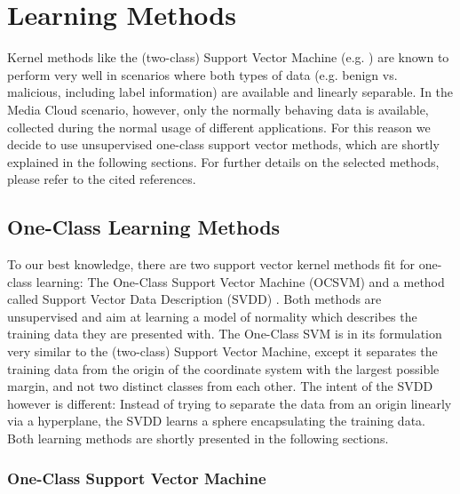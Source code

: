 \documentclass{llncs}
\begin{document}
\section{Learning Methods}
\label{sec:learningmethods}
Kernel methods like the (two-class) Support Vector Machine (e.g. \cite{cortes1995support,ShaChr04}) are known to perform very well in scenarios where both types of data (e.g. benign vs. malicious, including label information) are available and linearly separable. In the Media Cloud scenario, however, only the normally behaving data is available, collected during the normal usage of different applications. For this reason we decide to use unsupervised one-class support vector methods, which are shortly explained in the following sections. For further details on the selected methods, please refer to the cited references.

\subsection{One-Class Learning Methods}
\label{sec:oneclasslearningmethods}
To our best knowledge, there are two support vector kernel methods fit for one-class learning: The One-Class Support Vector Machine (OCSVM) \cite{scholkopf1999support} and a method called Support Vector Data Description (SVDD) \cite{tax2004support,changrevisit}. Both methods are unsupervised and aim at learning a model of normality which describes the training data they are presented with. The One-Class SVM is in its formulation very similar to the (two-class) Support Vector Machine, except it separates the training data from the origin of the coordinate system with the largest possible margin, and not two distinct classes from each other. The intent of the SVDD however is different: Instead of trying to separate the data from an origin linearly via a hyperplane, the SVDD learns a sphere encapsulating the training data. Both learning methods are shortly presented in the following sections.


\subsubsection{One-Class Support Vector Machine}
\end{document}
